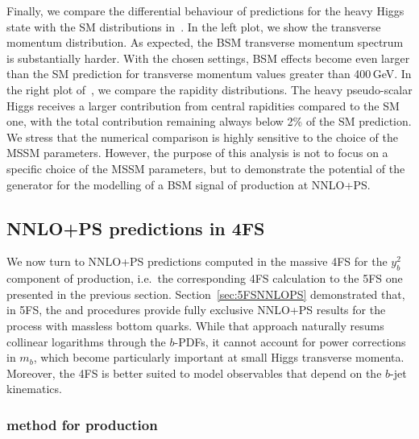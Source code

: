 \documentclass[11pt,a4paper]{article}
\begin{document}
Finally, we compare the differential behaviour of \minnlo{} predictions for the heavy Higgs state with the SM distributions in~. In the left plot, we show the transverse momentum distribution. 
As expected, the BSM transverse momentum spectrum is substantially harder. With the chosen settings, BSM effects become even larger than the SM prediction for transverse momentum values greater than 400\,GeV. 
In the right plot of~, we compare the rapidity distributions. The heavy pseudo-scalar Higgs receives a larger contribution from central rapidities compared to the SM one, with the total contribution remaining always below 2\% of the SM prediction. We stress that the numerical comparison is highly sensitive to the choice of the MSSM parameters. However, the purpose of this analysis is not to focus on a specific choice of the MSSM parameters, but to demonstrate the potential of the \minnlo{} generator 
for the modelling of a BSM signal of \bbH{} production at NNLO+PS.



\subsection{NNLO+PS predictions in 4FS}\label{sec:bbH4FS}

We now turn to NNLO+PS predictions computed in the massive 4FS for the $y_{b}^{2}$ component of \bbH{} production, i.e.\ the 
corresponding 4FS calculation to the 5FS one presented in the previous section.
Section~\ref{sec:5FSNNLOPS} demonstrated that, in 5FS, the \minnlo{} and \GENEVA{} procedures provide fully exclusive 
NNLO+PS results for the \bbH{} process with massless bottom quarks. While that approach naturally resums collinear logarithms 
through the $b$-PDFs, it cannot account for power corrections in $m_{b}$, which become particularly important at 
small Higgs transverse momenta. Moreover, the 4FS is better suited to model observables that depend on the $b$-jet kinematics.

\subsubsection[\minnlo{} method for $Q\bar Q F$ production]{\minnlo{} method for  production}\label{sec:bbH4FS}
\end{document}
